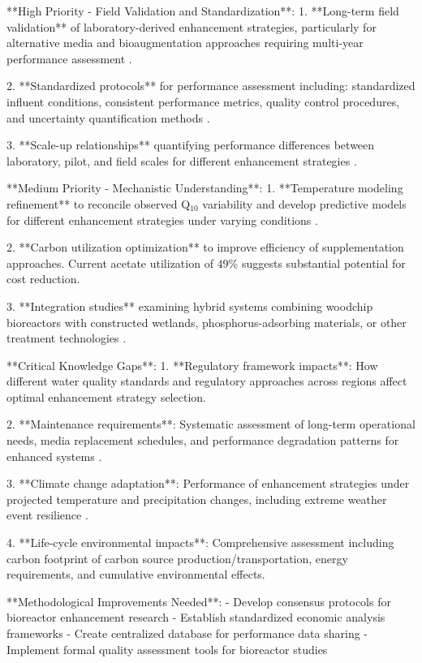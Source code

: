 \documentclass[12pt,a4paper]{article}
\begin{document}
**High Priority - Field Validation and Standardization**:
1. **Long-term field validation** of laboratory-derived enhancement strategies, particularly for alternative media and bioaugmentation approaches requiring multi-year performance assessment \citep{RN629}.

2. **Standardized protocols** for performance assessment including: standardized influent conditions, consistent performance metrics, quality control procedures, and uncertainty quantification methods \citep{RN310}.

3. **Scale-up relationships** quantifying performance differences between laboratory, pilot, and field scales for different enhancement strategies \citep{RN312}.

**Medium Priority - Mechanistic Understanding**:
1. **Temperature modeling refinement** to reconcile observed Q$_{10}$ variability and develop predictive models for different enhancement strategies under varying conditions \citep{RN242, RN258}.

2. **Carbon utilization optimization** to improve efficiency of supplementation approaches. Current acetate utilization of 49\% \citep{RN196} suggests substantial potential for cost reduction.

3. **Integration studies** examining hybrid systems combining woodchip bioreactors with constructed wetlands, phosphorus-adsorbing materials, or other treatment technologies \citep{RN370, RN291}.

**Critical Knowledge Gaps**:
1. **Regulatory framework impacts**: How different water quality standards and regulatory approaches across regions affect optimal enhancement strategy selection.

2. **Maintenance requirements**: Systematic assessment of long-term operational needs, media replacement schedules, and performance degradation patterns for enhanced systems \citep{RN958}.

3. **Climate change adaptation**: Performance of enhancement strategies under projected temperature and precipitation changes, including extreme weather event resilience \citep{RN1181}.

4. **Life-cycle environmental impacts**: Comprehensive assessment including carbon footprint of carbon source production/transportation, energy requirements, and cumulative environmental effects.

**Methodological Improvements Needed**:
- Develop consensus protocols for bioreactor enhancement research
- Establish standardized economic analysis frameworks
- Create centralized database for performance data sharing
- Implement formal quality assessment tools for bioreactor studies
\end{document}
